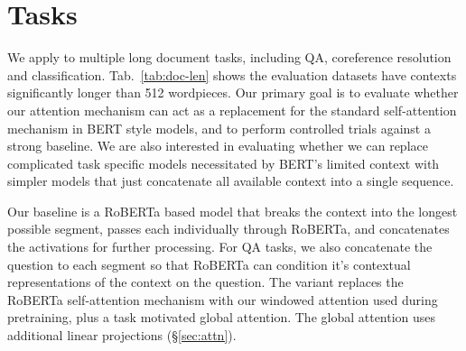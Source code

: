 
\section{Tasks}

We apply \model to multiple long document tasks, including QA, coreference resolution and classification.  Tab.~\ref{tab:doc-len} shows the evaluation datasets have contexts significantly longer than 512 wordpieces.
Our primary goal is to evaluate whether our attention mechanism can act as a replacement for the standard self-attention mechanism in BERT style models, and to perform controlled trials against a strong baseline.
We are also interested in evaluating whether we can replace complicated task specific models necessitated by BERT's limited context with simpler models that just concatenate all available context into a single sequence.

Our baseline is a RoBERTa based model that breaks the context into the longest possible segment, passes each individually through RoBERTa, and concatenates the activations for further processing.
For QA tasks, we also concatenate the question to each segment so that RoBERTa can condition it's contextual representations of the context on the question.
The \model variant replaces the RoBERTa self-attention mechanism with our windowed attention used during pretraining, plus a task motivated global attention.  The global attention uses additional linear projections (\S\ref{sec:attn}).%



